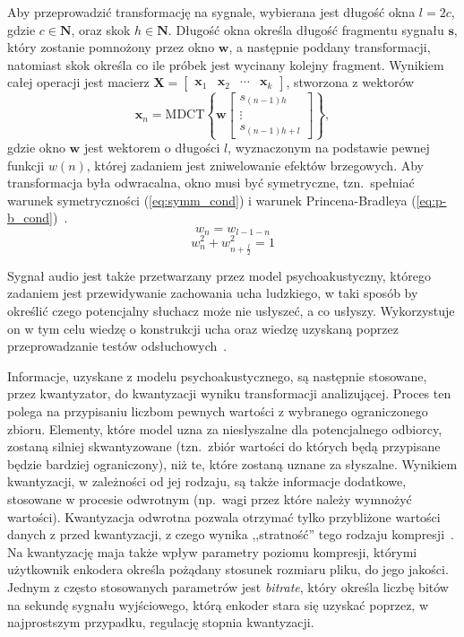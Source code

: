 \documentclass[pl,12pt]{aghdpl}
\begin{document}
Aby przeprowadzić transformację na sygnale, wybierana jest długość okna $l =
2c$, gdzie $c \in \bm N$, oraz skok $h \in \bm N$. Długość okna określa długość
fragmentu sygnału $\bm s$, który zostanie pomnożony przez okno $\bm w$, a
następnie poddany transformacji, natomiast skok określa co ile próbek jest
wycinany kolejny fragment. Wynikiem całej operacji jest macierz $\bm X =
\begin{bmatrix}\bm x_1 & \bm x_2 & \cdots  & \bm x_k\end{bmatrix}$, stworzona z
wektorów 
\begin{equation}
  \bm x_n = \text{MDCT}\left\{\bm w\begin{bmatrix}
      s_{(n-1)h}\\\vdots\\s_{(n-1)h+l}
  \end{bmatrix}\right\},
\end{equation}
gdzie okno $\bm w$ jest wektorem o długości $l$, wyznaczonym na podstawie
pewnej funkcji $w(n)$, której zadaniem jest zniwelowanie efektów brzegowych.
Aby transformacja była odwracalna, okno musi być symetryczne, tzn.\ spełniać
warunek symetryczności (\ref{eq:symm_cond}) i warunek Princena-Bradleya
(\ref{eq:p-b_cond})~\cite{PrincenBradley1986,
WangYaroslavskyVilermoVaananen2000}.
\begin{equation}\label{eq:symm_cond}
  w_n = w_{l-1-n}
\end{equation}
\begin{equation}\label{eq:p-b_cond}
  w_n^2+w_{n+\frac{l}{2}}^2 = 1
\end{equation}

Sygnał audio jest także przetwarzany przez model psychoakustyczny, którego
zadaniem jest przewidywanie zachowania ucha ludzkiego, w taki sposób by
określić czego potencjalny słuchacz może nie usłyszeć, a co usłyszy.
Wykorzystuje on w tym celu wiedzę o konstrukcji ucha oraz wiedzę uzyskaną
poprzez przeprowadzanie testów odsłuchowych~\cite{BosiGoldberg2002}.

Informacje, uzyskane z modelu psychoakustycznego, są następnie stosowane, przez
kwantyzator, do kwantyzacji wyniku transformacji analizującej. Proces ten
polega na przypisaniu liczbom pewnych wartości z wybranego ograniczonego
zbioru. Elementy, które model uzna za niesłyszalne dla potencjalnego odbiorcy,
zostaną silniej skwantyzowane (tzn.\ zbiór wartości do których będą przypisane
będzie bardziej ograniczony), niż te, które zostaną uznane za słyszalne. Wynikiem
kwantyzacji, w zależności od jej rodzaju, są także informacje dodatkowe,
stosowane w procesie odwrotnym (np.\ wagi przez które należy wymnożyć
wartości). Kwantyzacja odwrotna pozwala otrzymać tylko przybliżone wartości
danych z przed kwantyzacji, z czego wynika ,,stratność'' tego rodzaju
kompresji~\cite{Sayood2017}. Na kwantyzację maja także wpływ parametry poziomu
kompresji, którymi użytkownik enkodera określa pożądany stosunek rozmiaru
pliku, do jego jakości. Jednym z często stosowanych parametrów jest
\textit{bitrate}, który określa liczbę bitów na sekundę sygnału wyjściowego,
którą enkoder stara się uzyskać poprzez, w najprostszym przypadku, regulację
stopnia kwantyzacji.
\end{document}
